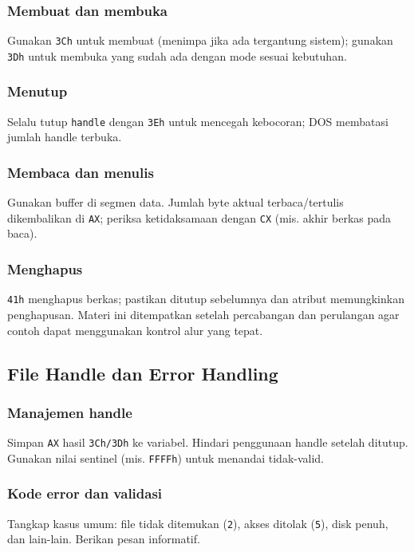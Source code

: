 \documentclass[../main.tex]{subfiles}
\begin{document}
            \subsubsection{Membuat dan membuka}
                Gunakan \texttt{3Ch} untuk membuat (menimpa jika ada tergantung sistem); gunakan \texttt{3Dh} untuk membuka yang sudah ada dengan mode sesuai kebutuhan.

            \subsubsection{Menutup}
                Selalu tutup \texttt{handle} dengan \texttt{3Eh} untuk mencegah kebocoran; DOS membatasi jumlah handle terbuka.

            \subsubsection{Membaca dan menulis}
                Gunakan buffer di segmen data. Jumlah byte aktual terbaca/tertulis dikembalikan di \texttt{AX}; periksa ketidaksamaan dengan \texttt{CX} (mis. akhir berkas pada baca).

            \subsubsection{Menghapus}
                \texttt{41h} menghapus berkas; pastikan ditutup sebelumnya dan atribut memungkinkan penghapusan. Materi ini ditempatkan setelah percabangan dan perulangan agar contoh dapat menggunakan kontrol alur yang tepat.

        \subsection{File Handle dan Error Handling}
            \subsubsection{Manajemen handle}
                Simpan \texttt{AX} hasil \texttt{3Ch/3Dh} ke variabel. Hindari penggunaan handle setelah ditutup. Gunakan nilai sentinel (mis. \texttt{FFFFh}) untuk menandai tidak-valid.

            \subsubsection{Kode error dan validasi}
                Tangkap kasus umum: file tidak ditemukan (\texttt{2}), akses ditolak (\texttt{5}), disk penuh, dan lain-lain. Berikan pesan informatif.
\end{document}
